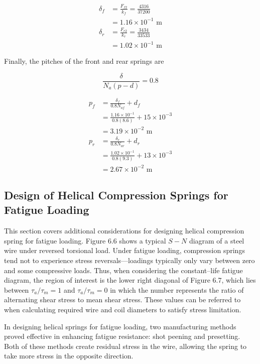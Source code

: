 \documentclass[
10pt,
a4paper,
openany,
svgnames,
]{book}
\begin{document}
\begin{solution}
  \begin{align*}
    \delta_f &= \frac{F_{f2}}{k_f} = \frac{4316}{37200} \\
             &= 1.16 \times 10^{-1} \text{ m} \\
    \delta_r &= \frac{F_{r2}}{k_r} = \frac{3434}{33533} \\
             &= 1.02 \times 10^{-1} \text{ m}
  \end{align*}
  
  Finally, the pitches of the front and rear springs are

    \[\frac{\delta}{N_a(p - d)} = 0.8\]

  \begin{align*}
    p_f &= \frac{\delta_f}{0.8N_{af}} + d_f \\ 
          &= \frac{1.16 \times 10^{-1}}{0.8(8.6)} + 15 \times 10^{-3} \\ 
          &= 3.19 \times 10^{-2} \text{ m} \\
    p_r &= \frac{\delta_r}{0.8N_{ar}} + d_r \\ 
          &= \frac{1.02 \times 10^{-1}}{0.8(9.3)} + 13 \times 10^{-3} \\ 
          &= 2.67 \times 10^{-2} \text{ m}
  \end{align*}
\end{solution}

\subsection{Design of Helical Compression Springs for Fatigue Loading}

This section covers additional considerations for designing helical compression spring for fatigue loading. Figure 6.6 shows a typical $S-N$ diagram of a steel wire under reversed torsional load. Under fatigue loading, compression springs tend not to experience stress reversals—loadings typically only vary between zero and some compressive loads. Thus, when considering the constant--life fatigue diagram, the region of interest is the lower right diagonal of Figure 6.7, which lies between $\tau_a / \tau_m = 1$ and $\tau_a / \tau_m = 0$ in which the number represents the ratio of alternating shear stress to mean shear stress. These values can be referred to when calculating required wire and coil diameters to satisfy stress limitation.

In designing helical springs for fatigue loading, two manufacturing methods proved effective in enhancing fatigue resistance: shot peening and presetting. Both of these methods create residual stress in the wire, allowing the spring to take more stress in the opposite direction.
\end{document}
